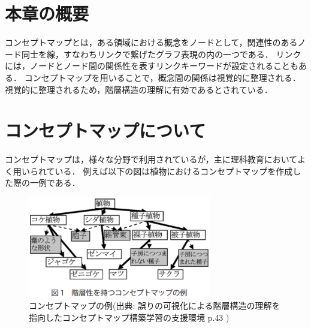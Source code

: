 \section{本章の概要}
コンセプトマップ\cite{concept}とは，ある領域における概念をノードとして，関連性のあるノード同士を線，すなわちリンクで繋げたグラフ表現の内の一つである．
リンクには，ノードとノード間の関係性を表すリンクキーワードが設定されることもある．
コンセプトマップを用いることで，概念間の関係は視覚的に整理される．
視覚的に整理されるため，階層構造の理解に有効であるとされている．

\section{コンセプトマップについて}
コンセプトマップは，様々な分野で利用されているが，主に理科教育においてよく用いられている\cite{yama}\cite{saito}．
例えば以下の図は植物におけるコンセプトマップを作成した際の一例である．

\begin{figure}[htbp]
\begin{center}
\includegraphics[width=8cm]{img/example_concept.eps}
\end{center}
\caption{コンセプトマップの例(出典: 誤りの可視化による階層構造の理解を指向したコンセプトマップ構築学習の支援環境 p.43 \cite{toumoto})}
\label{fig:example_concept}
\end{figure}